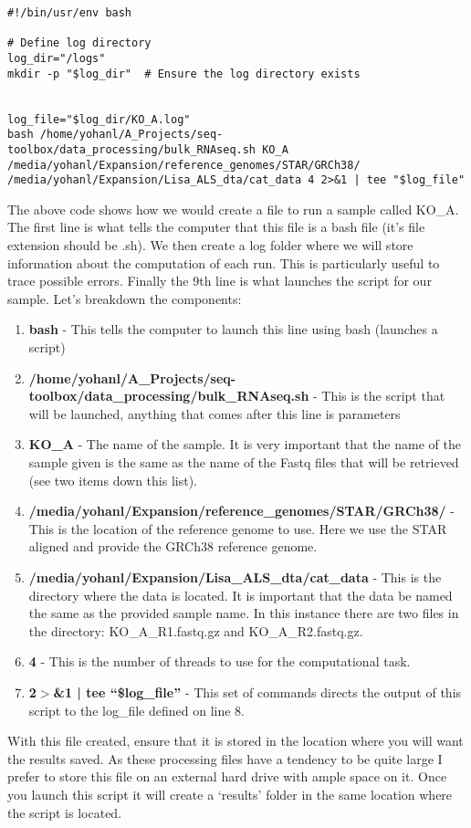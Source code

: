 \begin{lstlisting}
#!/bin/usr/env bash

# Define log directory
log_dir="/logs"
mkdir -p "$log_dir"  # Ensure the log directory exists


log_file="$log_dir/KO_A.log"
bash /home/yohanl/A_Projects/seq-toolbox/data_processing/bulk_RNAseq.sh KO_A /media/yohanl/Expansion/reference_genomes/STAR/GRCh38/ /media/yohanl/Expansion/Lisa_ALS_dta/cat_data 4 2>&1 | tee "$log_file"

\end{lstlisting}
The above code shows how we would create a file to run a sample called KO\_A. The first line is what tells the computer that this file is a bash file (it's file extension should be .sh). We then create a log folder where we will store information about the computation of each run. This is particularly useful to trace possible errors. Finally the 9th line is what launches the script for our sample. Let's breakdown the components:
\begin{enumerate}
\item \textbf{bash} - This tells the computer to launch this line using bash (launches a script)
\item \textbf{/home/yohanl/A\_Projects/seq-toolbox/data\_processing/bulk\_RNAseq.sh} - This is the script that will be launched, anything that comes after this line is parameters
\item \textbf{KO\_A} - The name of the sample. It is very important that the name of the sample given is the same as the name of the Fastq files that will be retrieved (see two items down this list).
\item \textbf{/media/yohanl/Expansion/reference\_genomes/STAR/GRCh38/} - This is the location of the reference genome to use. Here we use the STAR aligned and provide the GRCh38 reference genome.
\item \textbf{/media/yohanl/Expansion/Lisa\_ALS\_dta/cat\_data} - This is the directory where the data is located. It is important that the data be named the same as the provided sample name. In this instance there are two files in the directory: KO\_A\_R1.fastq.gz and KO\_A\_R2.fastq.gz.
\item \textbf{4} - This is the number of threads to use for the computational task.

\item \textbf{2$>$\&1 | tee ``\$log\_file''} - This set of commands directs the output of this script to the log\_file defined on line 8.
\end{enumerate}
With this file created, ensure that it is stored in the location where you will want the results saved. As these processing files have a tendency to be quite large I prefer to store this file on an external hard drive with ample space on it. Once you launch this script it will create a `results' folder in the same location where the script is located. 

